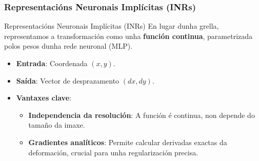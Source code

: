 \documentclass[xcolor=dvipsnames]{beamer}
\begin{document}
\begin{frame}
    \frametitle{Representacións Neuronais Implícitas (INRs)}
    \begin{block}{Representacións Neuronais Implícitas (INRs)}
        En lugar dunha grella, representamos a transformación como unha \textbf{función continua}, parametrizada polos pesos dunha rede neuronal (MLP).
        \begin{itemize}
            \item \textbf{Entrada}: Coordenada $(x, y)$.
            \item \textbf{Saída}: Vector de desprazamento $(dx, dy)$.
            \item \textbf{Vantaxes clave}:
            \begin{itemize}
                \item \textbf{Independencia da resolución}: A función é continua, non depende do tamaño da imaxe.
                \item \textbf{Gradientes analíticos}: Permite calcular derivadas exactas da deformación, crucial para unha regularización precisa.
            \end{itemize}
        \end{itemize}
    \end{block}
\end{frame}
  
\end{document}
